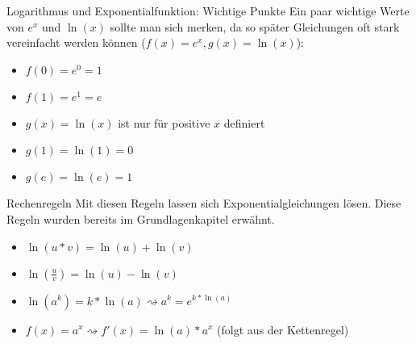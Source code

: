 \begin{bla}{Logarithmus und Exponentialfunktion: Wichtige Punkte}
  Ein paar wichtige Werte von $e^x$ und $\ln(x)$ sollte man sich merken, da so später Gleichungen oft stark vereinfacht werden können ($f(x)=e^x, g(x)=\ln(x)$):
  \begin{itemize}
    \item $f(0)=e^0=1$
    \item $f(1)=e^1=e$
    \item $g(x)=\ln(x)$ ist nur für positive $x$ definiert
    \item $g(1)=\ln(1)=0$
    \item $g(e)=\ln(e)=1$
  \end{itemize}
\end{bla}

\clearpage
\begin{bla}{Rechenregeln}
  Mit diesen Regeln lassen sich Exponentialgleichungen lösen. Diese Regeln wurden bereits im Grundlagenkapitel erwähnt.
  \begin{itemize}
    \item $\ln(u*v)=\ln(u)+\ln(v)$
    \item $\ln(\frac{u}{v})=\ln(u)-\ln(v)$
    \item $\ln(a^k)=k*\ln(a) \rightsquigarrow a^k=e^{k*\ln(a)}$
    \item $f(x)=a^x \rightsquigarrow f'(x)=\ln(a)*a^x$ (folgt aus der Kettenregel)
  \end{itemize}
\end{bla}

